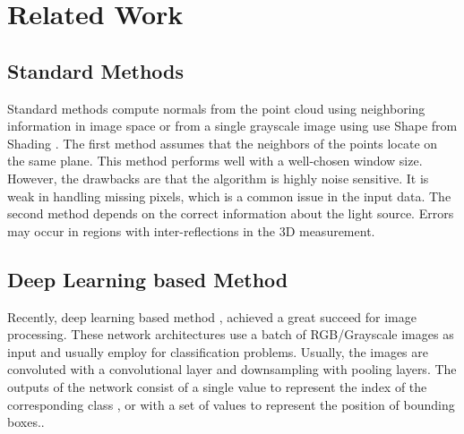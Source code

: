 
\chapter{Related Work} %

\label{ch:02} %

\section{Standard Methods}


Standard methods compute normals from the point cloud using neighboring information in image space or from a single grayscale image using use Shape from Shading \cite{SFS}. The first method assumes that the neighbors of the points locate on the same plane. This method performs well with a well-chosen window size. However, the drawbacks are that the algorithm is highly noise sensitive. It is weak in handling missing pixels, which is a common issue in the input data. The second method depends on the correct information about the light source. Errors may occur in regions with inter-reflections in the 3D measurement. 


\section{Deep Learning based Method}
Recently, deep learning based method \cite{yolov3}, \cite{efficientDet} achieved a great succeed for image processing. 
These network architectures use a batch of RGB/Grayscale images as input and usually employ for classification problems. Usually, the images are convoluted with a convolutional layer and downsampling with pooling layers. The outputs of the network consist of a single value to represent the index of the corresponding class \cite{efficientDet}, or with a set of values to represent the position of bounding boxes.\cite{yolov3}.  

